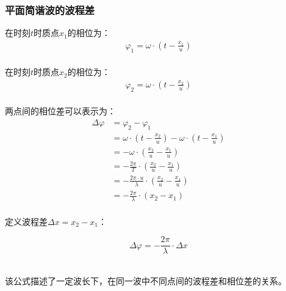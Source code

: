 \documentclass[UTF8]{ctexart}
\begin{document}
\subsubsection{平面简谐波的波程差}
    在时刻$t$时质点$x_1$的相位为：
    \setcounter{equation}{0}
    \begin{align}
        \varphi_1=\omega\cdot\left(t-\frac{x_1}{u}\right)
    \end{align}\\
    在时刻$t$时质点$x_2$的相位为：
    \begin{align}
        \varphi_2=\omega\cdot\left(t-\frac{x_2}{u}\right)
    \end{align}\\
    两点间的相位差可以表示为：
    \begin{align}
        \Delta\varphi
        &=\varphi_2-\varphi_1\\[5mm]
        &=\omega\cdot\left(t-\frac{x_2}{u}\right)-\omega\cdot\left(t-\frac{x_1}{u}\right)\\[5mm]
        &=-\omega\cdot\left(\frac{x_2}{u}-\frac{x_1}{u}\right)\\[5mm]
        &=-\frac{2\pi}{T}\cdot\left(\frac{x_2}{u}-\frac{x_1}{u}\right)\\[5mm]
        &=-\frac{2\pi\cdot u}{\lambda}\cdot\left(\frac{x_2}{u}-\frac{x_1}{u}\right)\\[5mm]
        &=-\frac{2\pi}{\lambda}\cdot\left(x_2-x_1\right)
    \end{align}\\
    定义波程差$\Delta x=x_2-x_1$：
    \begin{large}
        \begin{equation*}
            \Delta\varphi=-\frac{2\pi}{\lambda}\cdot\Delta x
        \end{equation*}
    \end{large}\\
    该公式描述了一定波长下，在同一波中不同点间的波程差和相位差的关系。

\newpage
\end{document}

